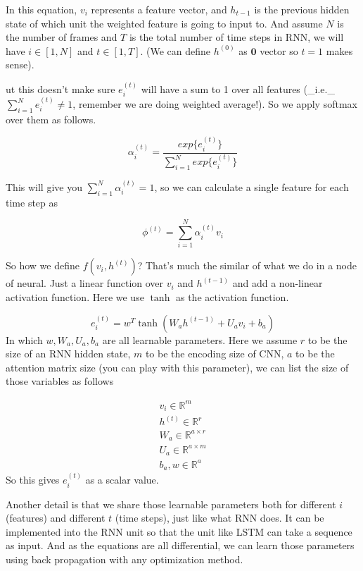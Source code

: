 In this equation, $v_i$ represents a feature vector, and $h_{t-1}$ is the previous hidden state of which unit the weighted feature is going to input to. And assume $N$ is the number of frames and $T$ is the total number of time steps in RNN, we will have $i\in [1,N]$ and $t\in [1,T]$. (We can define $h^{(0)}$ as $\mathbf{0}$ vector so $t=1$ makes sense).

ut this doesn't make sure $e_{i}^{(t)}$ will have a sum to 1 over all features (_i.e._ $\sum_{i=1}^Ne_i^{(t)}\neq 1$, remember we are doing weighted average!). So we apply softmax over them as follows.

\begin{equation}
\alpha_{i}^{(t)} = \frac{exp\{e_{i}^{(t)}\}}{\sum_{i=1}^Nexp\{e_{i}^{(t)}\}}
\end{equation}

This will give you $\sum_{i=1}^N\alpha_{i}^{(t)}=1$, so we can calculate a single feature for each time step as

\begin{equation}
\phi^{(t)}=\sum_{i=1}^N\alpha_{i}^{(t)}v_i
\end{equation}

So how we define $f(v_i,h^{(t)})$? That's much the similar of what we do in a node of neural. Just a linear function over $v_i$ and $h^{(t-1)}$ and add a non-linear activation function. Here we use $\tanh$ as the activation function.

\begin{equation}
e_{i}^{(t)} = w^T\tanh(W_ah^{(t-1)}+U_av_i+b_a)
\end{equation}
In which $w,W_a,U_a,b_a$ are all learnable parameters. Here we assume $r$ to be the size of an RNN hidden state, $m$ to be the encoding size of CNN, $a$ to be the attention matrix size (you can play with this parameter), we can list the size of those variables as follows

\begin{align}
v_i\in \mathbb{R}^{m} \\
h^{(t)}\in \mathbb{R}^{r}\\
W_a\in \mathbb{R}^{a\times r}\\
U_a\in \mathbb{R}^{a\times m}\\
b_a, w \in \mathbb{R}^{a}
\end{align}
So this gives $e_i^{(t)}$ as a scalar value.

Another detail is that we share those learnable parameters both for different $i$ (features) and different $t$ (time steps), just like what RNN does. It can be implemented into the RNN unit so that the unit like LSTM can take a sequence as input. And as the equations are all differential, we can learn those parameters using back propagation with any optimization method.

